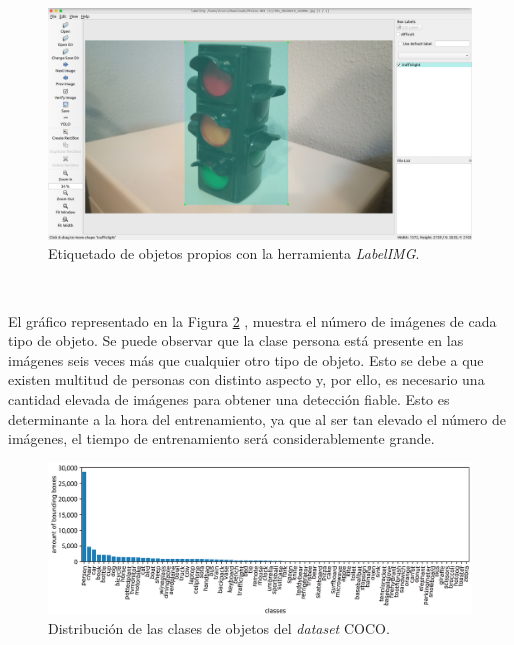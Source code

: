 \begin{figure} [h!]
	\begin{center}
		\includegraphics[width=14cm]{figs/customlabelimg}
	\end{center}
	\caption{Etiquetado de objetos propios con la herramienta \textit{LabelIMG}.}
	\label{fig:customlabelimg}
\end{figure}\

El gráfico representado en la Figura \ref{fig:graphcoco} \cite{graphcoco}, muestra el número de imágenes de cada tipo de objeto. Se puede observar que la clase persona está presente en las imágenes seis veces más que cualquier otro tipo de objeto. Esto se debe a que existen multitud de personas con distinto aspecto y, por ello, es necesario una cantidad elevada de imágenes para obtener una detección fiable. Esto es determinante a la hora del entrenamiento, ya que al ser tan elevado el número de imágenes, el tiempo de entrenamiento será considerablemente grande.\\

\begin{figure} [h!]
	\begin{center}
		\includegraphics[width=14cm]{figs/graphcoco}
	\end{center}
	\caption{Distribución de las clases de objetos del \textit{dataset} COCO.}
	\label{fig:graphcoco}
\end{figure}\

